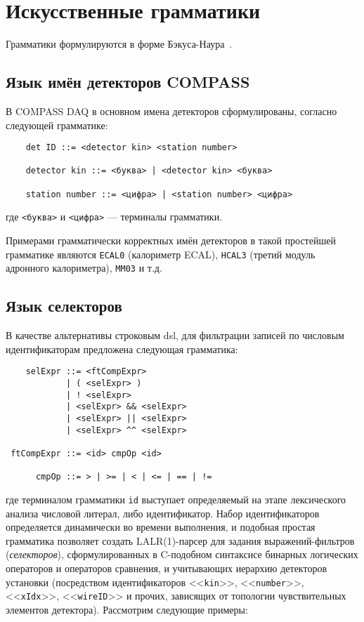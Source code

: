 \chapter{Искусственные грамматики}
\label{appendix:dsl-grammars}

Грамматики формулируются в форме Бэкуса-Наура~\cite{backusNaurAlgol1963revised}.

\section{Язык имён детекторов COMPASS}

В COMPASS DAQ в основном имена детекторов сформулированы,
согласно следующей грамматике:

\begin{verbatim}
    det ID ::= <detector kin> <station number>
    
    detector kin ::= <буква> | <detector kin> <буква>
    
    station number ::= <цифра> | <station number> <цифра>
\end{verbatim}
где \texttt{<буква>} и \texttt{<цифра>} --- терминалы грамматики.

Примерами грамматически корректных имён детекторов в такой простейшей
грамматике являются \texttt{ECAL0} (калориметр ECAL), \texttt{HCAL3}
(третий модуль адронного калориметра), \texttt{MM03} и т.д.

\section{Язык селекторов}

В качестве альтернативы строковым \acrshort{dsl}, для фильтрации записей
по числовым идентификаторам предложена следующая грамматика:
\begin{verbatim}
    selExpr ::= <ftCompExpr>
            | ( <selExpr> )
            | ! <selExpr>
            | <selExpr> && <selExpr>
            | <selExpr> || <selExpr>
            | <selExpr> ^^ <selExpr>
            
 ftCompExpr ::= <id> cmpOp <id>
 
      cmpOp ::= > | >= | < | <= | == | != 
\end{verbatim}
где терминалом грамматики \texttt{id} выступает определяемый на этапе
лексического анализа числовой литерал, либо идентификатор. Набор
идентификаторов определяется динамически во времени выполнения, и
подобная простая грамматика позволяет создать LALR(1)-парсер для
задания выражений-фильтров (\emph{селекторов}), сформулированных
в C-подобном синтаксисе бинарных логических операторов и операторов
сравнения, и учитывающих иерархию детекторов установки (посредством
идентификаторов <<\texttt{kin}>>, <<\texttt{number}>>,
<<\texttt{xIdx}>>, <<\texttt{wireID}>> и прочих, зависящих от топологии
чувствительных элементов детектора). Рассмотрим следующие примеры:

